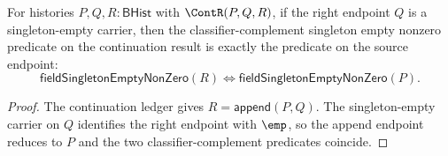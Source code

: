 \begin{lemma}
\label{lem:field-singleton-empty-nonzero-continuation-right-endpoint-cancel}
For histories $P,Q,R:\mathsf{BHist}$ with $\ContR(P,Q,R)$, if the right
endpoint $Q$ is a singleton-empty carrier, then the classifier-complement
singleton empty nonzero predicate on the continuation result is exactly the
predicate on the source endpoint:
$$
\mathsf{fieldSingletonEmptyNonZero}(R)
\Longleftrightarrow
\mathsf{fieldSingletonEmptyNonZero}(P).
$$
\end{lemma}
\begin{proof}
The continuation ledger gives $R=\mathsf{append}(P,Q)$. The singleton-empty
carrier on $Q$ identifies the right endpoint with $\emp$, so the append
endpoint reduces to $P$ and the two classifier-complement predicates coincide.
\end{proof}
